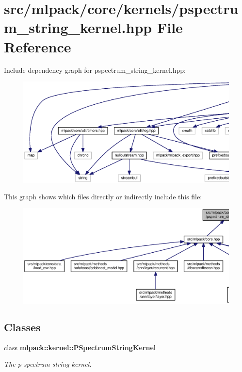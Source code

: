 \section{src/mlpack/core/kernels/pspectrum\+\_\+string\+\_\+kernel.hpp File Reference}
\label{pspectrum__string__kernel_8hpp}
Include dependency graph for pspectrum\+\_\+string\+\_\+kernel.\+hpp\+:
\nopagebreak
\begin{figure}[H]
\begin{center}
\leavevmode
\includegraphics[width=350pt]{pspectrum__string__kernel_8hpp__incl}
\end{center}
\end{figure}
This graph shows which files directly or indirectly include this file\+:
\nopagebreak
\begin{figure}[H]
\begin{center}
\leavevmode
\includegraphics[width=350pt]{pspectrum__string__kernel_8hpp__dep__incl}
\end{center}
\end{figure}
\subsection*{Classes}
\begin{DoxyCompactItemize}
\item 
class {\bf mlpack\+::kernel\+::\+P\+Spectrum\+String\+Kernel}
\begin{DoxyCompactList}\small\item\em The p-\/spectrum string kernel. \end{DoxyCompactList}\end{DoxyCompactItemize}
